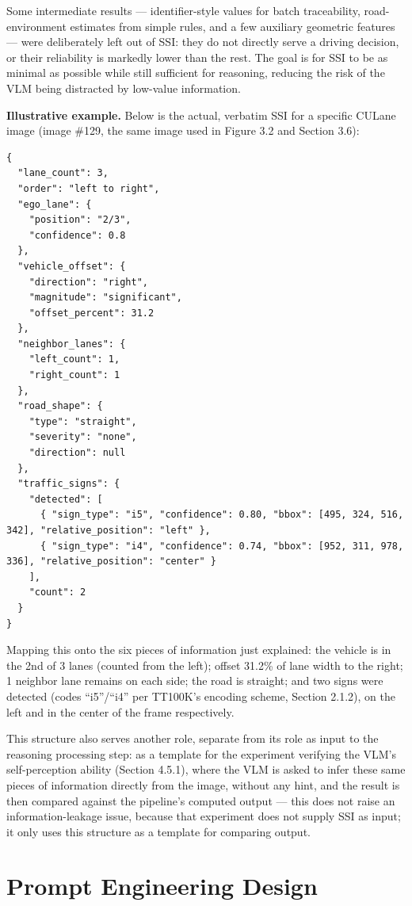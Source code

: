 \documentclass[12pt,a4paper]{report}
\begin{document}
Some intermediate results --- identifier-style values for batch traceability, road-environment estimates from simple rules, and a few auxiliary geometric features --- were deliberately left out of SSI: they do not directly serve a driving decision, or their reliability is markedly lower than the rest. The goal is for SSI to be as minimal as possible while still sufficient for reasoning, reducing the risk of the VLM being distracted by low-value information.

\textbf{Illustrative example.} Below is the actual, verbatim SSI for a specific CULane image (image \#129, the same image used in Figure 3.2 and Section 3.6):

{\small
\begin{verbatim}
{
  "lane_count": 3,
  "order": "left to right",
  "ego_lane": {
    "position": "2/3",
    "confidence": 0.8
  },
  "vehicle_offset": {
    "direction": "right",
    "magnitude": "significant",
    "offset_percent": 31.2
  },
  "neighbor_lanes": {
    "left_count": 1,
    "right_count": 1
  },
  "road_shape": {
    "type": "straight",
    "severity": "none",
    "direction": null
  },
  "traffic_signs": {
    "detected": [
      { "sign_type": "i5", "confidence": 0.80, "bbox": [495, 324, 516, 342], "relative_position": "left" },
      { "sign_type": "i4", "confidence": 0.74, "bbox": [952, 311, 978, 336], "relative_position": "center" }
    ],
    "count": 2
  }
}
\end{verbatim}
}

Mapping this onto the six pieces of information just explained: the vehicle is in the 2nd of 3 lanes (counted from the left); offset 31.2\% of lane width to the right; 1 neighbor lane remains on each side; the road is straight; and two signs were detected (codes ``i5''/``i4'' per TT100K's encoding scheme, Section 2.1.2), on the left and in the center of the frame respectively.

This structure also serves another role, separate from its role as input to the reasoning processing step: as a template for the experiment verifying the VLM's self-perception ability (Section 4.5.1), where the VLM is asked to infer these same pieces of information directly from the image, without any hint, and the result is then compared against the pipeline's computed output --- this does not raise an information-leakage issue, because that experiment does not supply SSI as input; it only uses this structure as a template for comparing output.

\section{Prompt Engineering Design}
\end{document}
